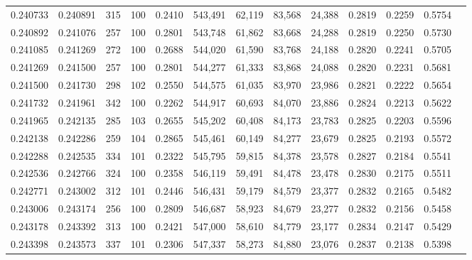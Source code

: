 \begin{tabular}{rrrrrrrrrrrrr}
0.240733 & 0.240891 &   315 & 100 &                                     0.2410 & 543,491 &  62,119 &  83,568 &  24,388 & 0.2819 & 0.2259 & 0.5754 \\
0.240892 & 0.241076 &   257 & 100 &                                     0.2801 & 543,748 &  61,862 &  83,668 &  24,288 & 0.2819 & 0.2250 & 0.5730 \\
0.241085 & 0.241269 &   272 & 100 &                                     0.2688 & 544,020 &  61,590 &  83,768 &  24,188 & 0.2820 & 0.2241 & 0.5705 \\
0.241269 & 0.241500 &   257 & 100 &                                     0.2801 & 544,277 &  61,333 &  83,868 &  24,088 & 0.2820 & 0.2231 & 0.5681 \\
0.241500 & 0.241730 &   298 & 102 &                                     0.2550 & 544,575 &  61,035 &  83,970 &  23,986 & 0.2821 & 0.2222 & 0.5654 \\
0.241732 & 0.241961 &   342 & 100 &                                     0.2262 & 544,917 &  60,693 &  84,070 &  23,886 & 0.2824 & 0.2213 & 0.5622 \\
0.241965 & 0.242135 &   285 & 103 &                                     0.2655 & 545,202 &  60,408 &  84,173 &  23,783 & 0.2825 & 0.2203 & 0.5596 \\
0.242138 & 0.242286 &   259 & 104 &                                     0.2865 & 545,461 &  60,149 &  84,277 &  23,679 & 0.2825 & 0.2193 & 0.5572 \\
0.242288 & 0.242535 &   334 & 101 &                                     0.2322 & 545,795 &  59,815 &  84,378 &  23,578 & 0.2827 & 0.2184 & 0.5541 \\
0.242536 & 0.242766 &   324 & 100 &                                     0.2358 & 546,119 &  59,491 &  84,478 &  23,478 & 0.2830 & 0.2175 & 0.5511 \\
0.242771 & 0.243002 &   312 & 101 &                                     0.2446 & 546,431 &  59,179 &  84,579 &  23,377 & 0.2832 & 0.2165 & 0.5482 \\
0.243006 & 0.243174 &   256 & 100 &                                     0.2809 & 546,687 &  58,923 &  84,679 &  23,277 & 0.2832 & 0.2156 & 0.5458 \\
0.243178 & 0.243392 &   313 & 100 &                                     0.2421 & 547,000 &  58,610 &  84,779 &  23,177 & 0.2834 & 0.2147 & 0.5429 \\
0.243398 & 0.243573 &   337 & 101 &                                     0.2306 & 547,337 &  58,273 &  84,880 &  23,076 & 0.2837 & 0.2138 & 0.5398 \\

\end{tabular}

